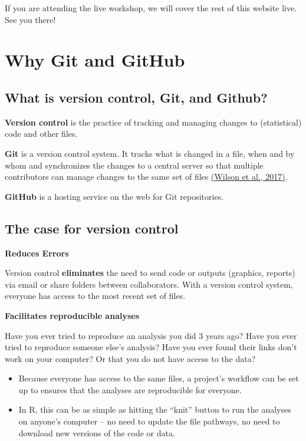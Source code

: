 \documentclass[
]{book}
\providecommand{\tightlist}{%
  \setlength{\itemsep}{0pt}\setlength{\parskip}{0pt}}
\begin{document}
If you are attending the live workshop, we will cover the rest of this website
live. See you there!

\chapter{Why Git and GitHub}\label{why-git-and-github}

\section{What is version control, Git, and Github?}\label{what-is-version-control-git-and-github}

\textbf{Version control} is the practice of tracking and managing changes to
(statistical) code and other files.

\textbf{Git} is a version control system. It tracks what is changed in a file,
when and by whom and synchronizes the changes to a central server so that multiple
contributors can manage changes to the same set of files \href{https://dx.plos.org/10.1371/journal.pcbi.1005510}{(Wilson et al., 2017)}.

\textbf{GitHub} is a hosting service on the web for Git repositories.

\section{The case for version control}\label{the-case-for-version-control}

\textbf{Reduces Errors}

Version control \textbf{eliminates} the need to send code or outputs (graphics,
reports) via email or share folders between collaborators. With a version
control system, everyone has access to the most recent set of files.

\textbf{Facilitates reproducible analyses}

Have you ever tried to reproduce an analysis you did 3 years ago? Have you ever
tried to reproduce someone else's analysis? Have you ever found their links
don't work on your computer? Or that you do not have access to the data?

\begin{itemize}
\tightlist
\item
  Because everyone has access to the same files, a project's workflow can be set up
  to ensures that the analyses are reproducible for everyone.
\item
  In R, this can be as simple as hitting the ``knit'' button to run the analyses
  on anyone's computer -- no need to update the file pathways, no need to download
  new versions of the code or data.
\end{itemize}
\end{document}
